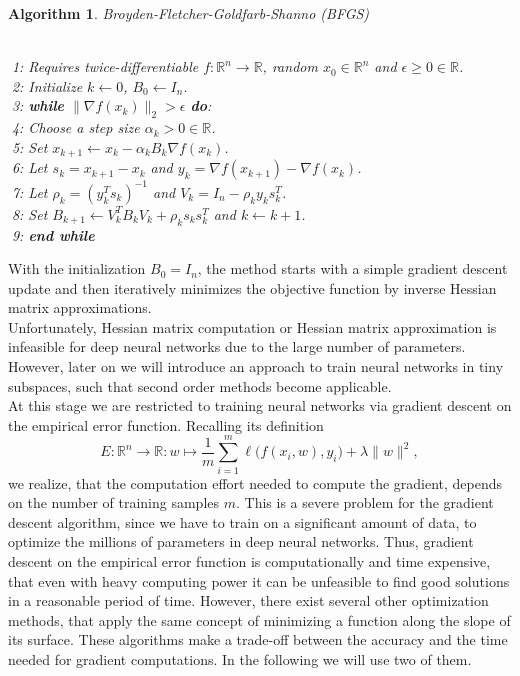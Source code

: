 \documentclass[11pt, a4paper]{article}
\newtheorem{algorithm}[theorem]{Algorithm}
\newcommand{\R}{\mathds{R}}
\begin{document}
\begin{algorithm}
\caption{Broyden-Fletcher-Goldfarb-Shanno (BFGS)} \ \\
\textcolor{white}{$\Big |$}1: Requires twice-differentiable $f: \R^n \to \R$, random $x_0 \in \R^n$ and  $\epsilon \geq 0 \in \R$. \\
\textcolor{white}{$\Big |$}2: Initialize $k \leftarrow 0$, $B_0 \leftarrow I_n$. \\
\textcolor{white}{$\Big |$}3: \textbf{while} $ \| \nabla f(x_k) \|_2 > \epsilon $ \textbf{do}: \\
\textcolor{white}{$\Big |$}4: \quad Choose a step size $\alpha_k > 0 \in \R$. \\
\textcolor{white}{$\Big |$}5: \quad Set $x_{k+1} \leftarrow x_k - \alpha_k B_k \nabla f(x_{k})$. \\
\textcolor{white}{$\Big |$}6: \quad Let $s_k = x_{k+1} - x_{k}$ and $y_k = \nabla f(x_{k+1}) - \nabla f(x_{k})$. \\
\textcolor{white}{$\Big |$}7: \quad Let $\rho_k = (y_k^Ts_k)^{-1}$ and $V_k = I_n - \rho_k y_k s_k^T$. \\
\textcolor{white}{$\Big |$}8: \quad Set $B_{k+1} \leftarrow V_k^TB_{k}V_k + \rho_k s_k s_k^T$ and $k \leftarrow k+1$. \\
\textcolor{white}{$\Big |$}9: \textbf{end while}
\end{algorithm}

With the initialization $B_0 = I_n$, the method starts with a simple gradient descent update and then iteratively minimizes the objective function by inverse Hessian matrix approximations. \\

Unfortunately, Hessian matrix computation or Hessian matrix approximation is infeasible for deep neural networks due to the large number of parameters. However, later on we will introduce an approach to train neural networks in tiny subspaces, such that second order methods become applicable. \\

At this stage we are restricted to training neural networks via gradient descent on the empirical error function. Recalling its definition
 \[ E : \R^n \to \R : w \mapsto \frac{1}{m} \sum_{i=1}^{m} \ell \big ( f(x_i,w),y_i \big) + \lambda \| w \|^2, \]
we realize, that the computation effort needed to compute the gradient, depends on the number of training samples $m$. This is a severe problem for the gradient descent algorithm, since we have to train on a significant amount of data, to optimize the millions of parameters in deep neural networks. Thus, gradient descent on the empirical error function is computationally and time expensive, that even with heavy computing power it can be unfeasible to find good solutions in a reasonable period of time. However, there exist several other optimization methods, that apply the same concept of minimizing a function along the slope of its surface. These algorithms make a trade-off between the accuracy and the time needed for gradient computations. In the following we will use two of them. \\
\end{document}
